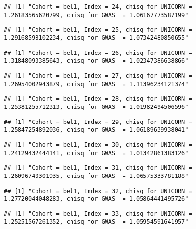 \documentclass[]{article}
\begin{document}
\begin{verbatim}
## [1] "Cohort = bel1, Index = 24, chisq for UNICORN = 1.26183565620799, chisq for GWAS  = 1.06167773587199"
\end{verbatim}

\begin{verbatim}
## [1] "Cohort = bel1, Index = 25, chisq for UNICORN = 1.29168598102234, chisq for GWAS  = 1.07342480850655"
\end{verbatim}

\begin{verbatim}
## [1] "Cohort = bel1, Index = 26, chisq for UNICORN = 1.31848093385643, chisq for GWAS  = 1.02347386638866"
\end{verbatim}

\begin{verbatim}
## [1] "Cohort = bel1, Index = 27, chisq for UNICORN = 1.26954002943879, chisq for GWAS  = 1.11396234121374"
\end{verbatim}

\begin{verbatim}
## [1] "Cohort = bel1, Index = 28, chisq for UNICORN = 1.25381255712313, chisq for GWAS  = 1.01982494506596"
\end{verbatim}

\begin{verbatim}
## [1] "Cohort = bel1, Index = 29, chisq for UNICORN = 1.25847254892036, chisq for GWAS  = 1.06189639938041"
\end{verbatim}

\begin{verbatim}
## [1] "Cohort = bel1, Index = 30, chisq for UNICORN = 1.24129432444141, chisq for GWAS  = 1.01342861383126"
\end{verbatim}

\begin{verbatim}
## [1] "Cohort = bel1, Index = 31, chisq for UNICORN = 1.26096740301935, chisq for GWAS  = 1.06575333781188"
\end{verbatim}

\begin{verbatim}
## [1] "Cohort = bel1, Index = 32, chisq for UNICORN = 1.27720044048283, chisq for GWAS  = 1.05864441495726"
\end{verbatim}

\begin{verbatim}
## [1] "Cohort = bel1, Index = 33, chisq for UNICORN = 1.25251567261352, chisq for GWAS  = 1.05954591641957"
\end{verbatim}
\end{document}
